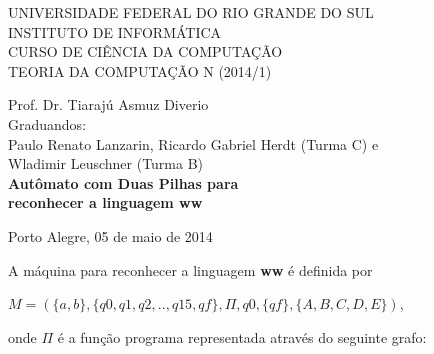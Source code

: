 \documentclass[a4paper]{article}
\begin{document}
\begin{titlepage}
\begin{center}


\large{ 
\uppercase{ Universidade Federal do Rio Grande do Sul\\

Instituto de Informática \\

Curso de Ciência da Computação \\

Teoria da Computação N (2014/1)\\
}

Prof. Dr. Tiarajú Asmuz Diverio \\


Graduandos: \\ Paulo Renato Lanzarin, Ricardo Gabriel Herdt (Turma C) e \\
	Wladimir Leuschner (Turma B) \\[4.5cm]



\LARGE {\bfseries Autômato com Duas Pilhas para \\
	reconhecer a linguagem ww \\[1.0cm]
}}


\vfill

Porto Alegre, 05 de maio de 2014

\end{center}
\end{titlepage}

A máquina para reconhecer a linguagem \textbf{ww} é definida por

$M = (\{a, b\}, \{q0, q1, q2, .., q15, qf\}, \Pi, q0, \{qf\}, \{A, B, C, D, E\})$, 

onde $\Pi$ é a função programa representada através do seguinte grafo:
\end{document}
